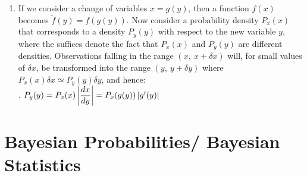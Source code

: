 \begin{enumerate}
    \item If we consider a change of variables $x = g(y)$, then a function $f (x)$ becomes $\tilde{f} (y) = f (g(y))$.
    Now consider a probability density $P_x(x)$ that corresponds to a density $P_y (y)$ with respect to the new variable $y$, where the suffices denote the fact that $P_x(x)$ and $P_y (y)$ are different densities.
    Observations falling in the range $(x,\ x + \delta x)$ will, for small values of $\delta x$, be transformed into the range $(y,\ y + \delta y)$ where $P_x(x)\delta x \simeq P_y (y)\delta y$, and hence:
    \hfill \cite{ml/book/Pattern-Recognition-And-Machine-Learning/Christopher-M-Bishop}
    \\[0.2cm]
    .\hfill
    $
        P_y(y)
        = P_x(x) \left| \dfrac{dx}{dy} \right|
        = P_x(g(y)) \left| g^\prime(y) \right|
    $
    \hfill \cite{ml/book/Pattern-Recognition-And-Machine-Learning/Christopher-M-Bishop}
\end{enumerate}








\section{Bayesian Probabilities/ Bayesian Statistics}

